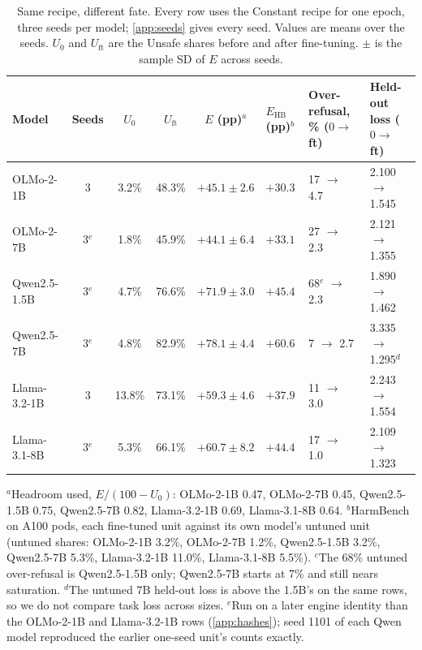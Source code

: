 \documentclass{article}
\newcommand{\Uo}{U_0}
\newcommand{\Uft}{U_{\mathrm{ft}}}
\newcommand{\Ehb}{E_{\mathrm{HB}}}
\begin{document}
\begin{table}[t]
  \caption{Same recipe, different fate. Every row uses the Constant recipe for
    one epoch, three seeds per model; \cref{app:seeds} gives every seed.
    Values are means over the seeds. $\Uo$ and $\Uft$ are the Unsafe shares
    before and after fine-tuning. $\pm$ is the sample SD of $E$ across seeds.}
  \label{tab:family}
  \centering
  \small
  \setlength{\tabcolsep}{4pt}
  \begin{tabular}{@{}l c c c c C{2.8cm} C{2.3cm} C{2.3cm}@{}}
    \toprule
    Model & Seeds & $\Uo$ & $\Uft$ & $E$ (pp)$^{a}$ & $\Ehb$ (pp)$^{b}$ & Over-refusal, \% ($0 \to$ ft) & Held-out loss ($0 \to$ ft) \\
    \midrule
    OLMo-2-1B & 3 & 3.2\% & 48.3\% & $\mathbf{+45.1} \pm 2.6$ & $+30.3$ & 17 $\to$ 4.7 & 2.100 $\to$ 1.545 \\
    OLMo-2-7B & 3$^{e}$ & 1.8\% & 45.9\% & $\mathbf{+44.1} \pm 6.4$ & $+33.1$ & 27 $\to$ 2.3 & 2.121 $\to$ 1.355 \\
    Qwen2.5-1.5B & 3$^{e}$ & 4.7\% & 76.6\% & $\mathbf{+71.9} \pm 3.0$ & $+45.4$ & 68$^{c}$ $\to$ 2.3 & 1.890 $\to$ 1.462 \\
    Qwen2.5-7B & 3$^{e}$ & 4.8\% & 82.9\% & $\mathbf{+78.1} \pm 4.4$ & $+60.6$ & 7 $\to$ 2.7 & 3.335 $\to$ 1.295$^{d}$ \\
    Llama-3.2-1B & 3 & 13.8\% & 73.1\% & $\mathbf{+59.3} \pm 4.6$ & $+37.9$ & 11 $\to$ 3.0 & 2.243 $\to$ 1.554 \\
    Llama-3.1-8B & 3$^{e}$ & 5.3\% & 66.1\% & $\mathbf{+60.7} \pm 8.2$ & $+44.4$ & 17 $\to$ 1.0 & 2.109 $\to$ 1.323 \\
    \bottomrule
  \end{tabular}

  \smallskip
  \parbox{\textwidth}{\footnotesize\raggedright
    $^{a}$Headroom used, $E/(100 - \Uo)$: OLMo-2-1B 0.47, OLMo-2-7B 0.45,
    Qwen2.5-1.5B 0.75, Qwen2.5-7B 0.82, Llama-3.2-1B 0.69, Llama-3.1-8B 0.64.
    $^{b}$HarmBench on A100 pods, each fine-tuned unit against its own model's
    untuned unit (untuned shares: OLMo-2-1B 3.2\%, OLMo-2-7B 1.2\%,
    Qwen2.5-1.5B 3.2\%, Qwen2.5-7B 5.3\%, Llama-3.2-1B 11.0\%, Llama-3.1-8B
    5.5\%).
    $^{c}$The 68\% untuned over-refusal is Qwen2.5-1.5B only; Qwen2.5-7B starts
    at 7\% and still nears saturation.
    $^{d}$The untuned 7B held-out loss is above the 1.5B's on the same rows, so
    we do not compare task loss across sizes.
    $^{e}$Run on a later engine identity than the OLMo-2-1B and Llama-3.2-1B
    rows (\cref{app:hashes}); seed 1101 of each Qwen model reproduced the
    earlier one-seed unit's counts exactly.}
\end{table}
\end{document}
